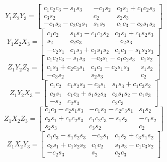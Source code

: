 \begin{equation*}
Y_1 Z_2 Y_3 = \begin{bmatrix}
 c_1 c_2 c_3 - s_1 s_3 & - c_1 s_2 & c_3 s_1 + c_1 c_2 s_3 \\
 c_3 s_2 & c_2 & s_2 s_3 \\
  - c_1 s_3 - c_2 c_3 s_1 & s_1 s_2 & c_1 c_3 - c_2 s_1 s_3 
\end{bmatrix}
\end{equation*}
\begin{equation*}
Y_1 Z_2 X_3 = \begin{bmatrix}
 c_1 c_2 & s_1 s_3 - c_1 c_3 s_2 & c_3 s_1 + c_1 s_2 s_3 \\
 s_2 & c_2 c_3 & - c_2 s_3 \\
 - c_2 s_1 & c_1 s_3 + c_3 s_1 s_2 & c_1 c_3 - s_1 s_2 s_3 
\end{bmatrix}
\end{equation*}
\begin{equation*}
Z_1 Y_2 Z_3 = \begin{bmatrix}
 c_1 c_2 c_3 - s_1 s_3 &  - c_3 s_1 - c_1 c_2 s_3 & c_1 s_2 \\
 c_1 s_3 + c_2 c_3 s_1 & c_1 c_3 - c_2 s_1 s_3 & s_1 s_2 \\
 - c_3 s_2 & s_2 s_3 & c_2 
\end{bmatrix}
\end{equation*}
\begin{equation*}
Z_1 Y_2 X_3 = \begin{bmatrix}
 c_1 c_2 & c_1 s_2 s_3 - c_3 s_1 & s_1 s_3 + c_1 c_3 s_2 \\
 c_2 s_1 & c_1 c_3 + s_1 s_2 s_3 & c_3 s_1 s_2 - c_1 s_3 \\
 - s_2 & c_2 s_3 & c_2 c_3 
\end{bmatrix}
\end{equation*}
\begin{equation*}
Z_1 X_2 Z_3 = \begin{bmatrix}
 c_1 c_3 - c_2 s_1 s_3 &  - c_1 s_3 - c_2 c_3 s_1 & s_1 s_2 \\
 c_3 s_1 + c_1 c_2 s_3 & c_1 c_2 c_3 - s_1 s_3 & - c_1 s_2 \\
 s_2 s_3 & c_3 s_2 & c_2 
\end{bmatrix}
\end{equation*}
\begin{equation*}
Z_1 X_2 Y_3 = \begin{bmatrix}
 c_1 c_3 - s_1 s_2 s_3 & - c_2 s_1 & c_1 s_3 + c_3 s_1 s_2 \\
 c_3 s_1 + c_1 s_2 s_3 & c_1 c_2 & s_1 s_3 - c_1 c_3 s_2 \\
 - c_2 s_3 & s_2 & c_2 c_3 
\end{bmatrix}
\end{equation*}

